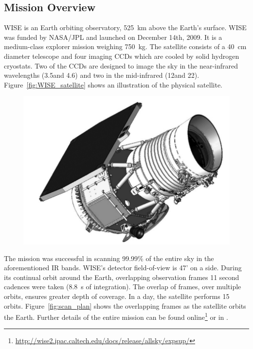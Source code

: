     \subsection{Mission Overview}\label{sec:wise_overview}


    WISE is an Earth orbiting observatory, 525~km above the Earth's surface. WISE was funded by NASA/JPL and launched on December 14th, 2009. It is a medium-class explorer mission weighing 750~kg. The satellite consists of a 40~cm diameter telescope and four imaging CCDs which are cooled by solid hydrogen cryostats. Two of the CCDs are designed to image the sky in the near-infrared wavelengths (3.5\micron and 4.6\micron) and two in the mid-infrared (12\micron and 22\micron). Figure~\ref{fig:WISE_satellite} shows an illustration of the physical satellite. 
  
    
    \begin{figure}
    \centering
    \includegraphics[width=\textwidth]{Ch2/wise_satellite}
    \caption[]{}
    \label{fig:WISE_Satellite}
    \end{figure}
    
 
    The mission was successful in scanning 99.99\% of the entire sky in the aforementioned IR bands. WISE's detector field-of-view is 47' on a side. During its continual orbit around the Earth, overlapping observation frames 11 second cadences were taken (8.8~s of integration). The overlap of frames, over multiple orbits, ensures greater depth of coverage. In a day, the satellite performs 15 orbits. Figure~\ref{fig:scan_plan} shows the overlapping frames as the satellite orbits the Earth. Further details of the entire mission can be found online\footnote{\url{http://wise2.ipac.caltech.edu/docs/release/allsky/expsup/}} or in \citet{Wright2010}. 

